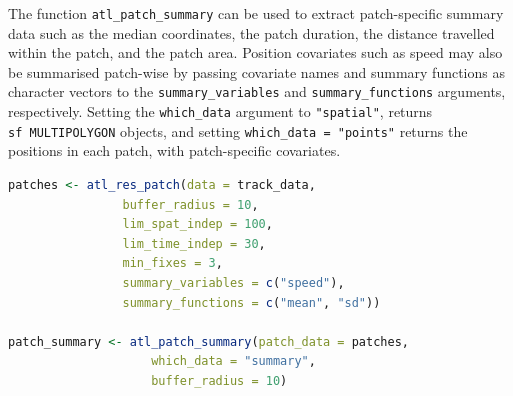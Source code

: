 \documentclass[10pt,paper=a4,headings=standardclasses
]{scrartcl}
\begin{document}
The function \texttt{atl\_patch\_summary} can be used to extract patch-specific summary data such as the median coordinates, the patch duration, the distance travelled within the patch, and the patch area.
Position covariates such as speed may also be summarised patch-wise by passing covariate names and  summary functions as character vectors to the \texttt{summary\_variables} and \texttt{summary\_functions} arguments, respectively.
Setting the \texttt{which\_data} argument to \texttt{"spatial"}, returns \texttt{sf\ MULTIPOLYGON} objects, and setting \texttt{which\_data = "points"} returns the positions in each patch, with patch-specific covariates.

\begin{lstlisting}[float, language=R, style=customR, caption ={The \texttt{atl\_res\_patch} function can be used to classify a track into residence patches. The arguments \texttt{buffer\_radius} and \texttt{lim\_spat\_indep} are specified in metres, while the \texttt{lim\_time\_indep} is provided in minutes. In this example, specifying \texttt{summary\_variables = c("speed")}, and \texttt{summary\_functions = c("mean", "sd")} will provide the mean and standard deviation of instantaneous speed in each residence patch. The \texttt{atl\_patch\_summary} function is used to access the classified patch in one of three ways, here using the \texttt{summary} option which returns a table of patch-wise summary statistics.}]
patches <- atl_res_patch(data = track_data,
                buffer_radius = 10,
                lim_spat_indep = 100,
                lim_time_indep = 30,
                min_fixes = 3,
                summary_variables = c("speed"),
                summary_functions = c("mean", "sd"))
              
patch_summary <- atl_patch_summary(patch_data = patches,
                    which_data = "summary",
                    buffer_radius = 10)
\end{lstlisting}
\end{document}
